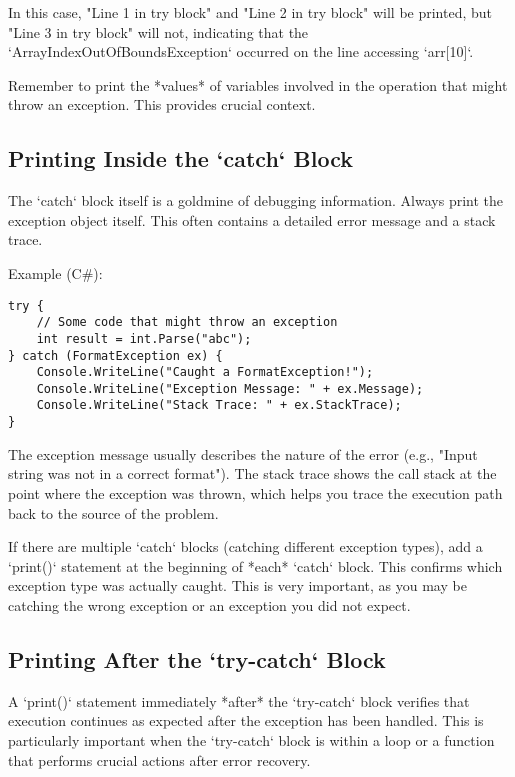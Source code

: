 \documentclass{article}
\begin{document}
{{{In this case, "Line 1 in try block" and "Line 2 in try block" will be printed, but "Line 3 in try block" will not, indicating that the `ArrayIndexOutOfBoundsException` occurred on the line accessing `arr[10]`.

Remember to print the *values* of variables involved in the operation that might throw an exception. This provides crucial context.

\subsection*{Printing Inside the `catch` Block}

The `catch` block itself is a goldmine of debugging information.  Always print the exception object itself. This often contains a detailed error message and a stack trace.

Example (C\#):

\begin{verbatim}
try {
    // Some code that might throw an exception
    int result = int.Parse("abc");
} catch (FormatException ex) {
    Console.WriteLine("Caught a FormatException!");
    Console.WriteLine("Exception Message: " + ex.Message);
    Console.WriteLine("Stack Trace: " + ex.StackTrace);
}
\end{verbatim}

The exception message usually describes the nature of the error (e.g., "Input string was not in a correct format"). The stack trace shows the call stack at the point where the exception was thrown, which helps you trace the execution path back to the source of the problem.

If there are multiple `catch` blocks (catching different exception types), add a `print()` statement at the beginning of *each* `catch` block. This confirms which exception type was actually caught. This is very important, as you may be catching the wrong exception or an exception you did not expect.

\subsection*{Printing After the `try-catch` Block}

A `print()` statement immediately *after* the `try-catch` block verifies that execution continues as expected after the exception has been handled. This is particularly important when the `try-catch` block is within a loop or a function that performs crucial actions after error recovery.

}}}
\end{document}
